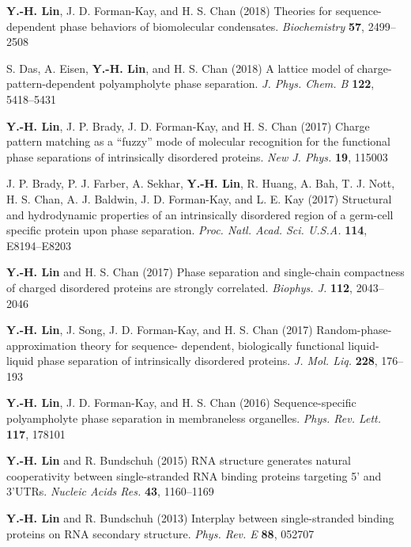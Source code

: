 \documentclass[11pt,letterpaper, sans]{article}
\newcommand{\tname}[1]{{\bf #1}}%
\begin{document}
\begin{flushleft}
\begin{etaremune}[leftmargin=17pt]
\item
\tname{Y.-H. Lin}, J. D. Forman-Kay, and H. S. Chan (2018)
Theories for sequence-dependent phase behaviors of biomolecular condensates.
{\it Biochemistry} {\bf 57}, 2499--2508

\item 
S. Das, A. Eisen, \tname{Y.-H. Lin}, and H. S. Chan (2018)
A lattice model of charge-pattern-dependent polyampholyte phase separation.
{\it J. Phys. Chem. B} {\bf 122}, 5418--5431

\item
\tname{Y.-H. Lin}, J. P. Brady, J. D. Forman-Kay, and H. S. Chan (2017) 
Charge pattern matching as a ``fuzzy'' mode of molecular recognition for the functional phase separations of intrinsically disordered proteins.
{\it New J. Phys.} {\bf 19}, 115003

\item 
J. P. Brady, P. J. Farber, A. Sekhar, \tname{Y.-H. Lin}, R. Huang, A. Bah, T. J. Nott, H. S. Chan, A. J. Baldwin, J. D. Forman-Kay, and L. E. Kay (2017) 
Structural and hydrodynamic properties of an intrinsically disordered region of a germ-cell specific protein upon phase separation. 
{\it Proc. Natl. Acad. Sci. U.S.A.} {\bf 114}, E8194--E8203

\item
\tname{Y.-H. Lin} and H. S. Chan (2017) 
Phase separation and single-chain compactness of charged disordered proteins are strongly correlated. 
{\it Biophys. J.} {\bf 112}, 2043--2046

\item 
\tname{Y.-H. Lin}, J. Song, J. D. Forman-Kay, and H. S. Chan (2017) 
Random-phase-approximation theory for sequence-
dependent, biologically functional liquid-liquid phase separation of intrinsically disordered proteins. 
{\it J. Mol. Liq.} {\bf 228}, 176--193

\item
\tname{Y.-H. Lin}, J. D. Forman-Kay, and H. S. Chan (2016) 
Sequence-specific polyampholyte phase separation in membraneless organelles. 
{\it Phys. Rev. Lett.} {\bf 117}, 178101

\item 
\tname{Y.-H. Lin} and R. Bundschuh (2015) 
RNA structure generates natural cooperativity between single-stranded RNA binding proteins targeting 5' and 3'UTRs.
{\it Nucleic Acids Res.} {\bf 43}, 1160--1169

\item 
\tname{Y.-H. Lin} and R. Bundschuh (2013) 
Interplay between single-stranded binding proteins on RNA secondary structure.
{\it Phys. Rev. E} {\bf 88}, 052707
\end{etaremune} 


\end{flushleft}
\end{document}
